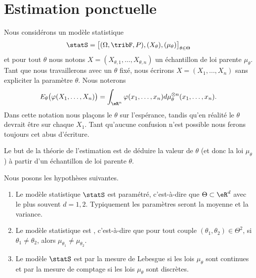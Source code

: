 \section{Estimation ponctuelle}

Nous considérons un modèle statistique
\begin{equation}
	\statS=\big[ (\Omega,\tribF,P),(X_{\theta}),(\mu_{\theta}) \big]_{\theta\in\Theta}
\end{equation}
et pour tout \( \theta\) nous notons \( X=(X_{\theta,1},\ldots,X_{\theta,n})\) un échantillon de loi parente \( \mu_{\theta}\). Tant que nous travaillerons avec un \( \theta\) fixé, nous écrirons \( X=(X_1,\ldots,X_n)\) sans expliciter la paramètre \( \theta\). Nous noterons
\begin{equation}        \label{EqFbKGZD}
	E_{\theta}\big( \varphi(X_1,\ldots,X_n) \big)=\int_{\eR^n}\varphi(x_1,\ldots,x_n)d\mu_{\theta}^{\otimes n}(x_1,\ldots,x_n).
\end{equation}
Dans cette notation nous plaçons le \( \theta\) sur l'espérance, tandis qu'en réalité le \( \theta\) devrait être sur chaque \( X_1\). Tant qu'aucune confusion n'est possible nous ferons toujours cet abus d'écriture.

Le but de la théorie de l'estimation est de déduire la valeur de \( \theta\) (et donc la loi \( \mu_{\theta}\)) à partir d'un échantillon de loi parente \( \theta\).

Nous posons les hypothèses suivantes.
\begin{enumerate}
	\item
	      Le modèle statistique \( \statS\) est paramétré, c'est-à-dire que \( \Theta\subset\eR^d\) avec le plus souvent \( d=1,2\). Typiquement les paramètres seront la moyenne et la variance.
	\item
	      Le modèle statistique est , c'est-à-dire que pour tout couple \( (\theta_1,\theta_2)\in\Theta^2\), si \( \theta_1\neq\theta_2\), alors \( \mu_{\theta_1}\neq\mu_{\theta_2}\).
	\item
	      Le modèle \( \statS\) est  par la mesure de Lebesgue si les lois \( \mu_{\theta}\) sont continues et par la mesure de comptage si les lois \( \mu_{\theta}\) sont discrètes.
\end{enumerate}

